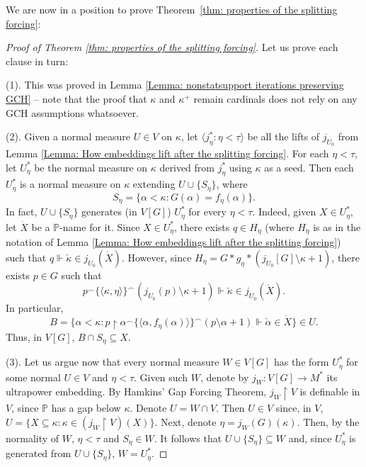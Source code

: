 \documentclass[11pt]{amsart}
\renewcommand{\restriction}{\mathbin\upharpoonright}    %
\theoremstyle{definition}
\theoremstyle{remark}
\newcommand\<{{<}}
\newcommand{\po}{\mathbb{P}}
\newcommand{\la}{\langle}
\newcommand{\ra}{\rangle}
\begin{document}
We are now in a position to prove Theorem~\ref{thm: properties of the splitting forcing}:

\begin{proof}[Proof of Theorem \ref{thm: properties of the splitting forcing}]
Let us prove each clause in turn: 

\smallskip

(1). This was proved in Lemma \ref{Lemma: nonstatsupport iterations preserving GCH} -- note that the proof that $\kappa$ and $\kappa^+$ remain cardinals does not rely on any GCH assumptions whatsoever.



 \smallskip
 
 (2). Given a normal measure $U\in V$ on $\kappa$, let $\la j^*_\eta \colon \eta<\tau \ra$ be all the lifts of $j_{U_0}$ from Lemma \ref{Lemma: How embeddings lift after the splitting forcing}. For each $\eta<\tau$, let $U^*_\eta$ be the normal measure on $\kappa$ derived from $j^*_\eta$ using $\kappa$ as a seed. Then each $U^*_\eta$ is a normal measure on $\kappa$ extending $U\cup \{ S_\eta \}$, where $$S_\eta = \{ \alpha<\kappa \colon G(\alpha) = f_\eta(\alpha) \}.$$
    In fact, $U\cup \{ S_\eta \}$ generates (in $V[G]$) $U^*_\eta$ for every $\eta<\tau$. Indeed, given $X\in U^*_\eta$, let  $\dot{X}$ be a $\po$-name for it. Since $X\in U^*_\eta$, there exists $q\in H_\eta$ (where $H_\eta$ is as in the notation of Lemma \ref{Lemma: How embeddings lift after the splitting forcing}) such that $q\Vdash \check{\kappa}\in j_{U_0}(\dot{X})$. However, since $H_\eta = G*g_\eta*\left( j_{U_0}[G]\setminus \kappa+1\right)$, there exists $p\in G$ such that 
$$p^{\frown} \{ \langle \kappa, \eta \rangle \}^{\frown} (j_{U_0}(p)\setminus \kappa+1)\Vdash \check{\kappa}\in j_{U_0}(\dot{X}).$$ In particular,
    $$B = \{ \alpha<\kappa \colon {p\restriction \alpha} ^{\frown} \{ \langle \alpha, f_{\eta}(\alpha) \rangle \}^{\frown} (p\setminus \alpha+1) \Vdash \check{\alpha}\in \dot{X} \}\in U.$$
    Thus, in $V[G]$, $B\cap S_\eta \subseteq X$. 

    \smallskip
    
    (3). Let us argue now that every normal measure $W\in V[G]$ has the form $U^*_\eta$ for some normal $U\in V$  and $\eta<\tau$. Given such $W$, denote by $j_W\colon V[G]\to M^*$ its ultrapower embedding. By Hamkins' Gap Forcing Theorem, $j_W\restriction V$ is definable in $V$, since $\po$ has a gap below $\kappa$. Denote $U = W\cap V$. Then $U\in V$ since, in $V$, $U = \{ X\subseteq \kappa \colon \kappa\in (j_W\restriction V)(X) \} $. Next, denote $\eta = j_W(G)(\kappa)$. Then, by the normality of $W$, $\eta< \tau$ 
    and $S_\eta\in W$. It follows that $U\cup \{ S_\eta \}\subseteq W$ and, since $U^*_\eta$ is generated from $U\cup \{ S_\eta \}$, $W = U^*_\eta$.
    \end{proof}
\end{document}
